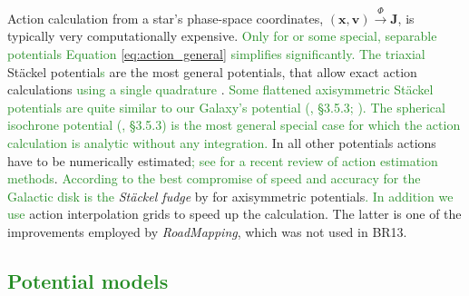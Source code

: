 \documentclass[iop,revtex4]{emulateapj}
\newcommand{\vect}[1]{\boldsymbol{#1}}
\newcommand{\RM}{{\sl RoadMapping}}
\newcommand{\NEW}[1]{\textcolor{ForestGreen}{#1}}
\newcommand{\OLD}[1]{}
\begin{document}
\OLD{Orbits in an axisymmetric gravitational potential $\Phi$ are best described and fully specified by the three actions $\vect{J} \equiv (J_R, J_z, J_\phi\equiv L_z)$ (Binney \& Tremaine 2008, \S 3.5).} 

Action calculation from a star's phase-space coordinates, $(\vect{x},\vect{v}) \stackrel{\Phi}{\longrightarrow} \vect{J}$, is typically very computationally expensive. \NEW{Only for or some special, separable potentials Equation \eqref{eq:action_general} simplifies significantly.} \OLD{The spherical isochrone potential 1959AnAp...22..126H and axisymmetric}\NEW{The triaxial} St\"{a}ckel potential\NEW{s} \citep{1985MNRAS.216..273D} are the most general  \OLD{(Galactic)} potentials, that allow exact action calculations \NEW{using a single quadrature} \OLD{(2008gady.book.....B, \S 3.5.2 and \S 3.5.3)}. \NEW{Some flattened axisymmetric St\"{a}ckel potentials are quite similar to our Galaxy's potential (\citealt{2008gady.book.....B}, \S 3.5.3; \citealt{1994AA...287...43B,2003MNRAS.340..752F}). The spherical isochrone potential (\citealt{1959AnAp...22..126H,2008gady.book.....B}, \S 3.5.3) is the most general special case for which the action calculation is analytic without any integration.} In all other potentials actions have to be numerically estimated\NEW{; see \cite{2015arXiv151108213S} for a recent review of action estimation methods}. \NEW{According to \cite{2015arXiv151108213S} the best compromise of speed and accuracy for the Galactic disk is the} \OLD{We use the} \emph{St\"{a}ckel fudge} by \citet{2012MNRAS.426.1324B} for axisymmetric potentials\NEW{. In addition we use} \OLD{and} action interpolation grids \citep{2012MNRAS.426.1324B,2015ApJS..216...29B} to speed up the calculation. The latter is one of the improvements employed by \RM{}, which was not used in BR13. 

\subsection{\NEW{Potential models}} %
\end{document}
